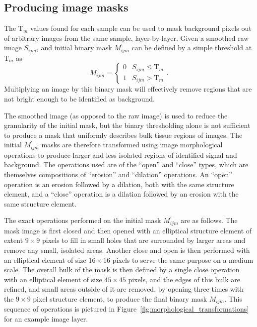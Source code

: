 \documentclass[letterpaper,11pt]{article}
\newcommand{\reffig}[1]{Figure~\ref{#1}}
\newcommand{\Tau}{\mathrm{T}}
\begin{document}
\subsection{Producing image masks}
\label{ssec:producing_image_masks}

The $\Tau_{m}$ values found for each sample can be used to mask background pixels out of arbitrary images from the same sample, layer-by-layer. Given a smoothed raw image $S_{ijm}$, and initial binary mask $M^{\prime}_{ijm}$ can be defined by a simple threshold at $\Tau_{m}$ as
\begin{equation}
M^{\prime}_{ijm} = 
\begin{cases} 
      0 & S_{ijm} \leq \Tau_{m} \\
      1 & S_{ijm} > \Tau_{m} 
\end{cases}
 .
\end{equation}
Multiplying an image by this binary mask will effectively remove regions that are not bright enough to be identified as background.

The smoothed image (as opposed to the raw image) is used to reduce the granularity of the initial mask, but the binary thresholding alone is not sufficient to produce a mask that uniformly describes bulk tissue regions of images. The initial $M^{\prime}_{ijm}$ masks are therefore transformed using image morphological operations \cite{opencv_mt} to produce larger and less isolated regions of identified signal and background. The operations used are of the ``open'' and ``close'' types, which are themselves compositions of ``erosion'' and ``dilation'' operations. An ``open'' operation is an erosion followed by a dilation, both with the same structure element, and a ``close'' operation is a dilation followed by an erosion with the same structure element.

The exact operations performed on the initial mask $M^{\prime}_{ijm}$ are as follows. The mask image is first closed and then opened with an elliptical structure element of extent $9 \times 9$ pixels to fill in small holes that are surrounded by larger areas and remove any small, isolated areas. Another close and open is then performed with an elliptical element of size $16 \times 16$ pixels to serve the same purpose on a medium scale. The overall bulk of the mask is then defined by a single close operation with an elliptical element of size $45 \times 45$ pixels, and the edges of this bulk are refined, and small areas outside of it are removed, by opening three times with the $9 \times 9$ pixel structure element, to produce the final binary mask $M_{ijm}$. This sequence of operations is pictured in \reffig{fig:morphological_transformations} for an example image layer. 
\end{document}

